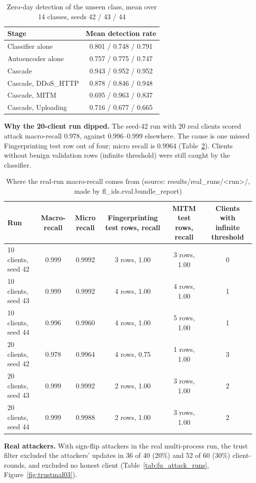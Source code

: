 \begin{table}[H]
\centering
\small
\setlength{\tabcolsep}{3pt}
\renewcommand{\arraystretch}{1.15}
\begin{tabular}{|l|c|}
\hline
\textbf{Stage} & \textbf{Mean detection rate} \\ \hline
Classifier alone & 0.801 / 0.748 / 0.791 \\ \hline
Autoencoder alone & 0.757 / 0.775 / 0.747 \\ \hline
Cascade & 0.943 / 0.952 / 0.952 \\ \hline
Cascade, DDoS\_HTTP & 0.878 / 0.846 / 0.948 \\ \hline
Cascade, MITM & 0.695 / 0.963 / 0.837 \\ \hline
Cascade, Uploading & 0.716 / 0.677 / 0.665 \\ \hline
\end{tabular}
\caption{Zero-day detection of the unseen class, mean over 14 classes, seeds 42 / 43 / 44}
\label{tab:fu_seed_zeroday}
\end{table}
\textbf{Why the 20-client run dipped.} The seed-42 run with 20 real clients scored attack macro-recall 0.978, against 0.996--0.999 elsewhere. The cause is one missed Fingerprinting test row out of four; micro recall is 0.9964 (Table~\ref{tab:fu_realrun_breakdown}). Clients without benign validation rows (infinite threshold) were still caught by the classifier.

\begin{table}[H]
\centering
\scriptsize
\setlength{\tabcolsep}{3pt}
\renewcommand{\arraystretch}{1.15}
\begin{tabular}{|l|c|c|c|c|c|}
\hline
\textbf{Run} & \textbf{Macro-recall} & \textbf{Micro recall} & \textbf{Fingerprinting test rows, recall} & \textbf{MITM test rows, recall} & \textbf{Clients with infinite threshold} \\ \hline
10 clients, seed 42 & 0.999 & 0.9992 & 3 rows, 1.00 & 3 rows, 1.00 & 0 \\ \hline
10 clients, seed 43 & 0.999 & 0.9992 & 4 rows, 1.00 & 4 rows, 1.00 & 1 \\ \hline
10 clients, seed 44 & 0.996 & 0.9960 & 4 rows, 1.00 & 5 rows, 1.00 & 1 \\ \hline
20 clients, seed 42 & 0.978 & 0.9964 & 4 rows, 0.75 & 1 rows, 1.00 & 3 \\ \hline
20 clients, seed 43 & 0.999 & 0.9992 & 2 rows, 1.00 & 3 rows, 1.00 & 2 \\ \hline
20 clients, seed 44 & 0.999 & 0.9988 & 2 rows, 1.00 & 3 rows, 1.00 & 2 \\ \hline
\end{tabular}
\caption{Where the real-run macro-recall comes from (source: results/real\_runs/<run>/, made by fl\_ids.eval.bundle\_report)}
\label{tab:fu_realrun_breakdown}
\end{table}
\textbf{Real attackers.} With sign-flip attackers in the real multi-process run, the trust filter excluded the attackers' updates in 36 of 40 (20\%) and 52 of 60 (30\%) client-rounds, and excluded no honest client (Table~\ref{tab:fu_attack_runs}, Figure~\ref{fig:trustmal03}).

